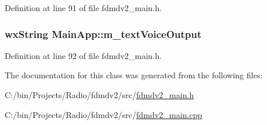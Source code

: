 Definition at line 91 of file fdmdv2\-\_\-main.\-h.

\hypertarget{class_main_app_a94e76172a575851642a5b80ecf14a7b9}{
\subsubsection[{m\-\_\-text\-Voice\-Output}]{\setlength{\rightskip}{0pt plus 5cm}wx\-String Main\-App\-::m\-\_\-text\-Voice\-Output}}\label{class_main_app_a94e76172a575851642a5b80ecf14a7b9}


Definition at line 92 of file fdmdv2\-\_\-main.\-h.



The documentation for this class was generated from the following files\-:\begin{DoxyCompactItemize}
\item 
C\-:/bin/\-Projects/\-Radio/fdmdv2/src/\hyperlink{fdmdv2__main_8h}{fdmdv2\-\_\-main.\-h}\item 
C\-:/bin/\-Projects/\-Radio/fdmdv2/src/\hyperlink{fdmdv2__main_8cpp}{fdmdv2\-\_\-main.\-cpp}\end{DoxyCompactItemize}
